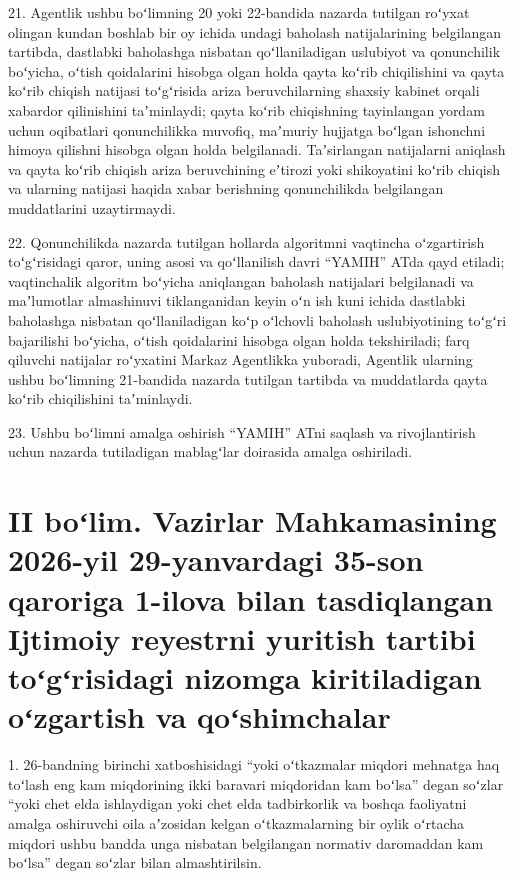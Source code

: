 \documentclass[14pt,a4paper]{extarticle}
\newcommand{\norm}[1]{\par\noindent\hspace*{1.27cm}#1. }
\begin{document}
\norm{21}Agentlik ushbu boʻlimning 20 yoki 22-bandida nazarda tutilgan roʻyxat olingan kundan boshlab bir oy ichida undagi baholash natijalarining belgilangan tartibda, dastlabki baholashga nisbatan qoʻllaniladigan uslubiyot va qonunchilik boʻyicha, oʻtish qoidalarini hisobga olgan holda qayta koʻrib chiqilishini va qayta koʻrib chiqish natijasi toʻgʻrisida ariza beruvchilarning shaxsiy kabinet orqali xabardor qilinishini taʼminlaydi; qayta koʻrib chiqishning tayinlangan yordam uchun oqibatlari qonunchilikka muvofiq, maʼmuriy hujjatga boʻlgan ishonchni himoya qilishni hisobga olgan holda belgilanadi. Taʼsirlangan natijalarni aniqlash va qayta koʻrib chiqish ariza beruvchining eʼtirozi yoki shikoyatini koʻrib chiqish va ularning natijasi haqida xabar berishning qonunchilikda belgilangan muddatlarini uzaytirmaydi.

\norm{22}Qonunchilikda nazarda tutilgan hollarda algoritmni vaqtincha oʻzgartirish toʻgʻrisidagi qaror, uning asosi va qoʻllanilish davri “YAMIH” ATda qayd etiladi; vaqtinchalik algoritm boʻyicha aniqlangan baholash natijalari belgilanadi va maʼlumotlar almashinuvi tiklanganidan keyin oʻn ish kuni ichida dastlabki baholashga nisbatan qoʻllaniladigan koʻp oʻlchovli baholash uslubiyotining toʻgʻri bajarilishi boʻyicha, oʻtish qoidalarini hisobga olgan holda tekshiriladi; farq qiluvchi natijalar roʻyxatini Markaz Agentlikka yuboradi, Agentlik ularning ushbu boʻlimning 21-bandida nazarda tutilgan tartibda va muddatlarda qayta koʻrib chiqilishini taʼminlaydi.

\norm{23}Ushbu boʻlimni amalga oshirish “YAMIH” ATni saqlash va rivojlantirish uchun nazarda tutiladigan mablagʻlar doirasida amalga oshiriladi.

\section*{II boʻlim. Vazirlar Mahkamasining 2026-yil 29-yanvardagi 35-son qaroriga 1-ilova bilan tasdiqlangan Ijtimoiy reyestrni yuritish tartibi toʻgʻrisidagi nizomga kiritiladigan oʻzgartish va qoʻshimchalar}

\norm{1}26-bandning birinchi xatboshisidagi “yoki oʻtkazmalar miqdori mehnatga haq toʻlash eng kam miqdorining ikki baravari miqdoridan kam boʻlsa” degan soʻzlar “yoki chet elda ishlaydigan yoki chet elda tadbirkorlik va boshqa faoliyatni amalga oshiruvchi oila aʼzosidan kelgan oʻtkazmalarning bir oylik oʻrtacha miqdori ushbu bandda unga nisbatan belgilangan normativ daromaddan kam boʻlsa” degan soʻzlar bilan almashtirilsin.
\end{document}
